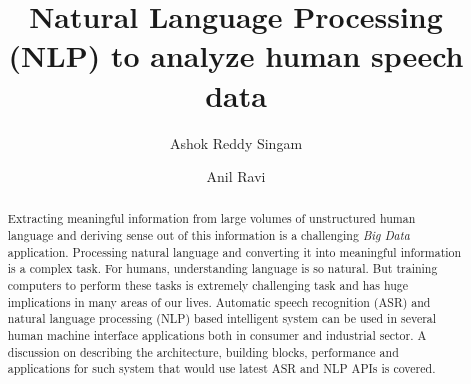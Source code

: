 \documentclass[sigconf]{acmart}
\begin{document}
\title{Natural Language Processing (NLP) to analyze human speech data}

\author{Ashok Reddy Singam}

\author{Anil Ravi}

\begin{abstract}
Extracting meaningful information from large volumes of unstructured human language and deriving sense out of this information is a challenging \textit{Big Data} application. Processing natural language and converting it into meaningful information is a complex task. For humans, understanding language is so natural. But training computers to perform these tasks is extremely challenging task and has huge implications in many areas of our lives. Automatic speech recognition (ASR) and natural language processing (NLP) based intelligent system can be  used in several human machine interface applications both in consumer and industrial sector. A discussion on describing the architecture, building blocks, performance and applications for such system that would use latest ASR and NLP APIs is covered.
\end{abstract}


\maketitle
\end{document}
